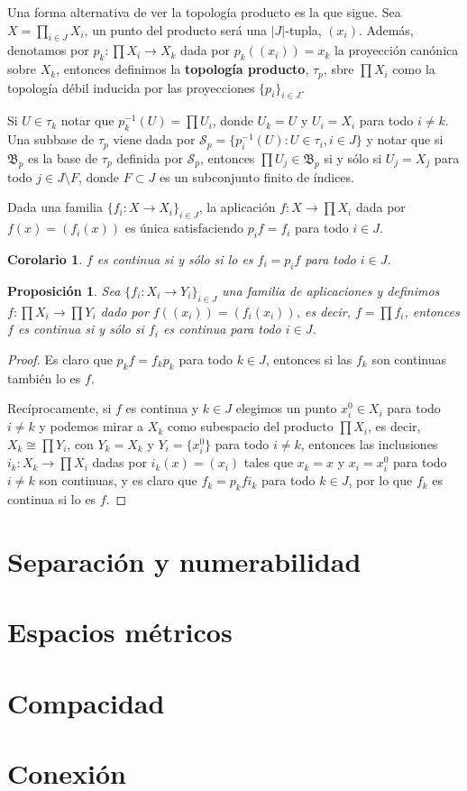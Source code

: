 \documentclass[12pt]{article}
\newtheorem{proposition}[theorem]{Proposición}
\newtheorem{corolario}{Corolario}[theorem]
\begin{document}
Una forma alternativa de ver la topología producto es la que sigue. Sea $X = \prod_{i\in J} X_i$, un punto del producto será una $|J|$-tupla, $(x_i)$. Además, denotamos por $p_k \colon \prod X_i \longrightarrow X_k$ dada por $p_k ((x_i)) = x_k$ la proyección canónica sobre $X_k$, entonces definimos la \textbf{topología producto}, $\tau_p$, sbre $\prod X_i$ como la topología débil inducida por las proyecciones $\lbrace p_i \rbrace_{i \in J}$.

Si $U \in \tau_k$ notar que $p_k^{-1}(U) = \prod U_i$, donde $U_k = U$ y $U_i = X_i$ para todo $i \neq k$. Una subbase de $\tau_p$ viene dada por $\mathcal{S}_p = \lbrace p_i^{-1}(U) : U \in \tau_i, i \in J \rbrace$ y notar que si $\mathfrak{B}_p$ es la base de $\tau_p$ definida por $\mathcal{S}_p$, entonces $\prod U_j \in \mathfrak{B}_p$ si y sólo si $U_j = X_j$ para todo $j \in J \setminus F$, donde $F \subset J$ es un subconjunto finito de índices.

Dada una familia $\lbrace f_i \colon X \longrightarrow X_i \rbrace_{i \in J}$, la aplicación $f \colon X \longrightarrow \prod X_i$ dada por $f(x) = (f_i(x))$ es única satisfaciendo $p_if = f_i$ para todo $i \in J$.

\begin{corolario}$f$ es continua si y sólo si lo es $f_i = p_if$ para todo $i \in J$.
\end{corolario}

\begin{proposition}Sea $\lbrace f_i \colon X_i \longrightarrow Y_i \rbrace _{i\in J}$ una familia de aplicaciones y definimos $f \colon \prod X_i \longrightarrow \prod Y_i$ dado por $f((x_i)) = (f_i(x_i))$, es decir, $f = \prod f_i$, entonces $f$ es continua si y sólo si $f_i$ es continua para todo $i \in J$.
\end{proposition}
\begin{proof}
Es claro que $p_kf = f_kp_k$ para todo $k \in J$, entonces si las $f_k$ son continuas también lo es $f$. 

Recíprocamente, si $f$ es continua y $k \in J$ elegimos un punto $x_i^0 \in X_i$ para todo $i \neq k$ y podemos mirar a $X_k$ como subespacio del producto $\prod X_i$, es decir, $X_k \cong \prod Y_i$, con $Y_k = X_k$ y $Y_i = \lbrace x_i^0 \rbrace$ para todo $i \neq k$, entonces las inclusiones $i_k \colon X_k \longrightarrow \prod X_i$ dadas por $i_k(x) = (x_i)$ tales que $x_k = x$ y $x_i = x_i^0$ para todo $i \neq k$ son continuas, y es claro que $f_k = p_kfi_k$ para todo $k \in J$, por lo que $f_k$ es continua si lo es $f$.

\end{proof}
\section{Separación y numerabilidad}
\section{Espacios métricos}
\section{Compacidad}
\section{Conexión}
\end{document}
